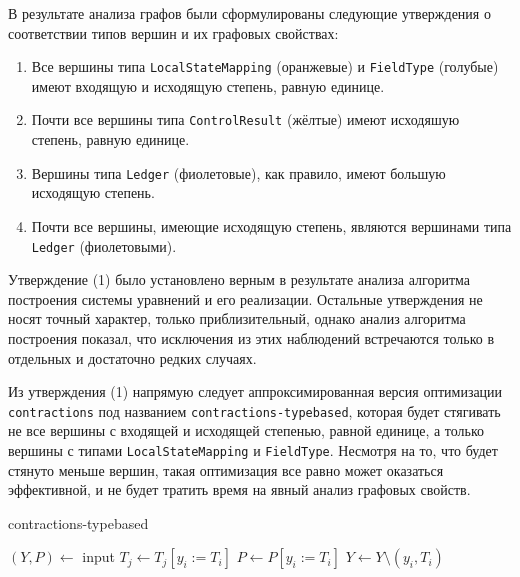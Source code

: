 \documentclass[../diploma.tex]{subfiles}
\begin{document}
В результате анализа графов были сформулированы следующие утверждения о соответствии типов вершин и их графовых свойствах:

\begin{enumerate}
    \item Все вершины типа \texttt{LocalStateMapping} (оранжевые) и \texttt{FieldType} (голубые) имеют входящую и исходящую степень, равную единице.
    \item Почти все вершины типа \texttt{ControlResult} (жёлтые) имеют исходяшую степень, равную единице.
    \item Вершины типа \texttt{Ledger} (фиолетовые), как правило, имеют большую исходящую степень.
    \item Почти все вершины, имеющие исходящую степень, являются вершинами типа \texttt{Ledger} (фиолетовыми).
\end{enumerate}

Утверждение (1) было установлено верным в результате анализа алгоритма построения системы уравнений и его реализации. Остальные утверждения не носят точный характер, только приблизительный, однако анализ алгоритма построения показал, что исключения из этих наблюдений встречаются только в отдельных и достаточно редких случаях.

Из утверждения (1) напрямую следует аппроксимированная версия оптимизации \texttt{contractions} под названием \texttt{contractions-typebased}, которая будет стягивать не все вершины с входящей и исходящей степенью, равной единице, а только вершины с типами \texttt{LocalStateMapping} и \texttt{FieldType}. Несмотря на то, что будет стянуто меньше вершин, такая оптимизация все равно может оказаться эффективной, и не будет тратить время на явный анализ графовых свойств.

\begin{megaalgorithm}
    \caption{contractions-typebased}
  \begin{algorithmic}
    \State $(Y, P)\gets$ input
        \If{\textcolor{red}{$typeof(y_i)$ is $LocalStateMapping$ or $FieldType$}}
                \State $T_j \gets T_j [y_i := T_i]$
            \EndFor
            \State $P \gets P [y_i := T_i]$
            \State $Y\gets Y \setminus (y_i, T_i)$
        \EndIf
    \EndFor
    \State {}
  \end{algorithmic}
\end{megaalgorithm} 
\end{document}
